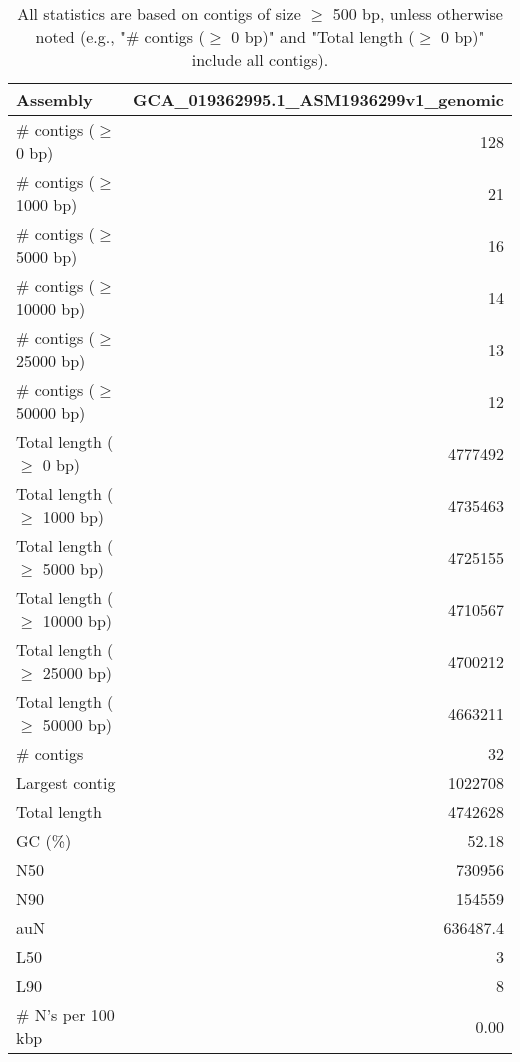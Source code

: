 \documentclass[12pt,a4paper]{article}
\begin{document}
\begin{table}[ht]
\begin{center}
\caption{All statistics are based on contigs of size $\geq$ 500 bp, unless otherwise noted (e.g., "\# contigs ($\geq$ 0 bp)" and "Total length ($\geq$ 0 bp)" include all contigs).}
\begin{tabular}{|l*{1}{|r}|}
\hline
Assembly & GCA\_019362995.1\_ASM1936299v1\_genomic \\ \hline
\# contigs ($\geq$ 0 bp) & 128 \\ \hline
\# contigs ($\geq$ 1000 bp) & 21 \\ \hline
\# contigs ($\geq$ 5000 bp) & 16 \\ \hline
\# contigs ($\geq$ 10000 bp) & 14 \\ \hline
\# contigs ($\geq$ 25000 bp) & 13 \\ \hline
\# contigs ($\geq$ 50000 bp) & 12 \\ \hline
Total length ($\geq$ 0 bp) & 4777492 \\ \hline
Total length ($\geq$ 1000 bp) & 4735463 \\ \hline
Total length ($\geq$ 5000 bp) & 4725155 \\ \hline
Total length ($\geq$ 10000 bp) & 4710567 \\ \hline
Total length ($\geq$ 25000 bp) & 4700212 \\ \hline
Total length ($\geq$ 50000 bp) & 4663211 \\ \hline
\# contigs & 32 \\ \hline
Largest contig & 1022708 \\ \hline
Total length & 4742628 \\ \hline
GC (\%) & 52.18 \\ \hline
N50 & 730956 \\ \hline
N90 & 154559 \\ \hline
auN & 636487.4 \\ \hline
L50 & 3 \\ \hline
L90 & 8 \\ \hline
\# N's per 100 kbp & 0.00 \\ \hline
\end{tabular}
\end{center}
\end{table}
\end{document}
